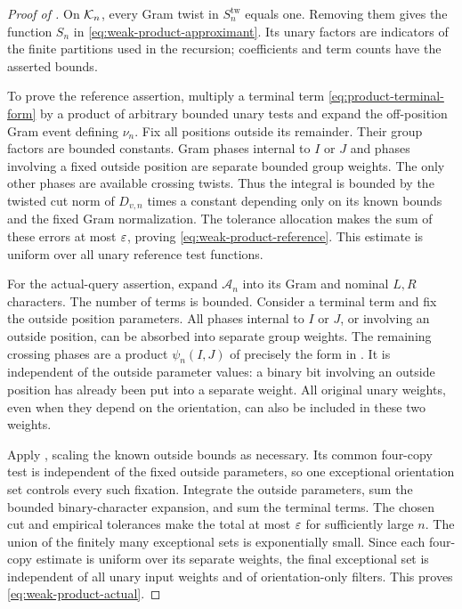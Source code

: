 \begin{proof}[Proof of ]
On $\mathcal K_n$, every Gram twist in $S_n^{\mathrm{tw}}$ equals one.
Removing them gives the function $S_n$ in
\eqref{eq:weak-product-approximant}. Its unary factors are indicators
of the finite partitions used in the recursion; coefficients and
term counts have the asserted bounds.

To prove the reference assertion, multiply a terminal term
\eqref{eq:product-terminal-form} by a product of arbitrary bounded
unary tests and expand the off-position Gram event defining $\nu_n$.
Fix all positions outside its remainder. Their group factors are
bounded constants. Gram phases internal to $I$ or $J$ and phases
involving a fixed outside position are separate bounded group
weights. The only other phases are available crossing twists.
Thus the integral is bounded by the twisted cut norm of $D_{v,n}$
times a constant depending only on its known bounds and the fixed
Gram normalization. The tolerance allocation makes the sum of these
errors at most $\varepsilon$, proving \eqref{eq:weak-product-reference}.
This estimate is uniform over all unary reference test functions.

For the actual-query assertion, expand $\mathcal A_n$ into its
Gram and nominal $L,R$ characters. The number of terms is bounded.
Consider a terminal term and fix the outside position parameters.
All phases internal to $I$ or $J$, or involving an outside position,
can be absorbed into separate group weights. The remaining crossing
phases are a product $\psi_n(I,J)$ of precisely the form in
. It is independent of the
outside parameter values: a binary bit involving an outside
position has already been put into a separate weight. All original
unary weights, even when they depend on the orientation, can also be
included in these two weights.

Apply , scaling the known
outside bounds as necessary. Its common four-copy test is
independent of the fixed outside parameters, so one exceptional
orientation set controls every such fixation. Integrate the outside
parameters, sum the bounded binary-character expansion, and sum the
terminal terms. The chosen cut and empirical tolerances make the
total at most $\varepsilon$ for sufficiently large $n$. The union of the
finitely many exceptional sets is exponentially small. Since each
four-copy estimate is uniform over its separate weights, the final
exceptional set is independent of all unary input weights and of
orientation-only filters. This proves
\eqref{eq:weak-product-actual}.
\end{proof}

